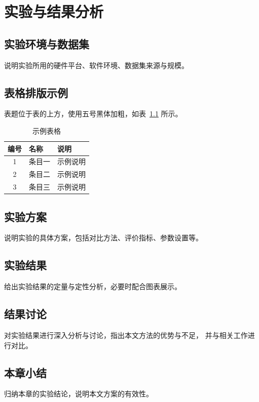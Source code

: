 %

\chapter{实验与结果分析}
\label{chap:experiment}

\section{实验环境与数据集}
说明实验所用的硬件平台、软件环境、数据集来源与规模。

\section{表格排版示例}
表题位于表的上方，使用五号黑体加粗，如表~\ref{tab:example}
所示。
\begin{table}[htbp]
\caption{示例表格}
\label{tab:example}
\centering
\begin{tabularx}{0.8\linewidth}{c|X|X}\toprule
编号 & 名称 & 说明 \\ \midrule
1 & 条目一 & 示例说明 \\
2 & 条目二 & 示例说明 \\
3 & 条目三 & 示例说明 \\ \bottomrule
\end{tabularx}
\end{table}

\section{实验方案}
说明实验的具体方案，包括对比方法、评价指标、参数设置等。

\section{实验结果}
给出实验结果的定量与定性分析，必要时配合图表展示。

\section{结果讨论}
对实验结果进行深入分析与讨论，指出本文方法的优势与不足，
并与相关工作进行对比。

\section{本章小结}
归纳本章的实验结论，说明本文方案的有效性。
